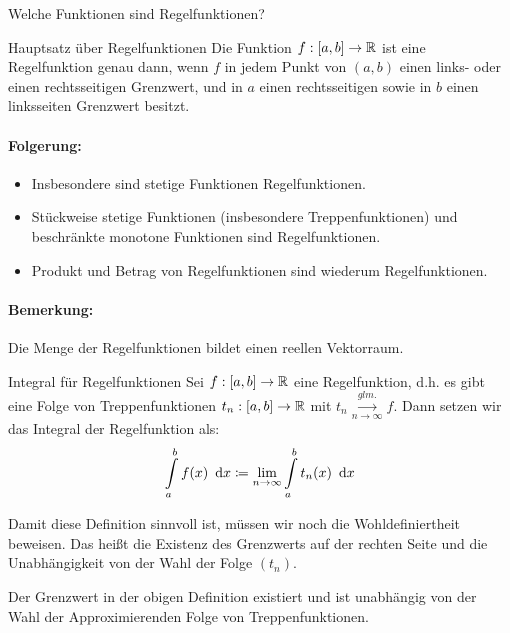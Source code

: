 Welche Funktionen sind Regelfunktionen?
\begin{satz}{Hauptsatz über Regelfunktionen}
	Die Funktion $f:[a,b]\rightarrow\mathbb{R}$ ist eine Regelfunktion genau dann, wenn $f$ in jedem Punkt von $(a,b)$ einen links- oder einen rechtsseitigen Grenzwert, und in $a$ einen rechtsseitigen sowie in $b$ einen linksseiten Grenzwert besitzt.
\end{satz}
\paragraph{Folgerung:}
\begin{itemize}
	\item Insbesondere sind stetige Funktionen Regelfunktionen.
	\item Stückweise stetige Funktionen (insbesondere Treppenfunktionen) und beschränkte monotone Funktionen sind Regelfunktionen.
	\item Produkt und Betrag von Regelfunktionen sind wiederum Regelfunktionen.
\end{itemize}
\paragraph{Bemerkung:}
Die Menge der Regelfunktionen bildet einen reellen Vektorraum.

\begin{definition}{Integral für Regelfunktionen}
	Sei $f:[a,b]\rightarrow\mathbb{R}$ eine Regelfunktion, d.h. es gibt eine Folge von Treppenfunktionen $t_n:[a,b]\rightarrow\mathbb{R}$ mit $t_n\overset{glm.}{\underset{n\to\infty}\longrightarrow} f$.
	Dann setzen wir das Integral der Regelfunktion als:
	\begin{equation*}
		\int\limits_a^b f(x)\ \operatorname{d}\! x\coloneqq \lim\limits_{n\to\infty}\int\limits_a^b t_n(x)\ \operatorname{d}\! x
	\end{equation*}
\end{definition}

Damit diese Definition sinnvoll ist, müssen wir noch die Wohldefiniertheit beweisen. Das heißt die Existenz des Grenzwerts auf der rechten Seite und die Unabhängigkeit von der Wahl der Folge $(t_n)$.

\begin{lemma}{}
	Der Grenzwert in der obigen Definition existiert und ist unabhängig von der Wahl der Approximierenden Folge von Treppenfunktionen.
\end{lemma}

